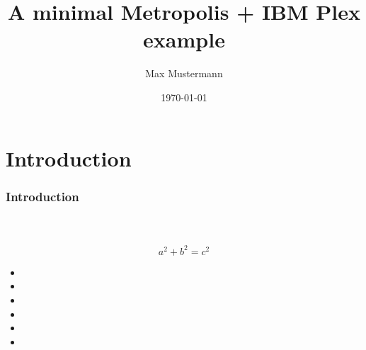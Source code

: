 \documentclass[12pt,ngerman]{beamer}
\title{A minimal Metropolis + IBM Plex example}
\date{\today}
\author{Max Mustermann}
\institute{The Name of the Institute}
\begin{document}
 
\begin{frame}
	 \maketitle
\end{frame}

\begin{frame}
	 \tableofcontents
\end{frame}

\section{Introduction}
 
\begin{frame}
\frametitle{Introduction}
\framesubtitle{~}
 
\[ a^2 + b^2 = c^2 \]
 
\begin{itemize}
\item 
\item 
\item 
\item 
\item 
\item 
\end{itemize}
\end{frame}
 
\end{document}
